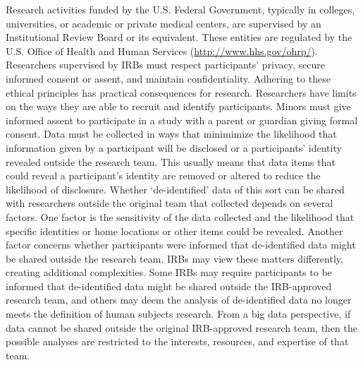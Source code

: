 \documentclass[letterpaper,man,apacite]{apa6}
\begin{document}
Research activities funded by the U.S. Federal Government, typically in colleges, universities, or academic or private medical centers, are supervised by an Institutional Review Board or its equivalent.
These entities are regulated by the U.S. Office of Health and Human Services (\url{http://www.hhs.gov/ohrp/}).
Researchers supervised by IRBs must respect participants' privacy, secure informed consent or assent, and maintain confidentiality. 
Adhering to these ethical principles has practical consequences for research.
Researchers have limits on the ways they are able to recruit and identify participants.
Minors must give informed assent to participate in a study with a parent or guardian giving formal consent.
Data must be collected in ways that minimimize the likelihood that information given by a participant will be disclosed or a participants' identity revealed outside the research team.
This usually means that data items that could reveal a participant's identity are removed or altered to reduce the likelihood of disclosure.
Whether `de-identified' data of this sort can be shared with researchers outside the original team that collected depends on several factors.
One factor is the sensitivity of the data collected and the likelihood that specific identities or home locations or other items could be revealed.
Another factor concerns whether participants were informed that de-identified data might be shared outside the research team.
IRBs may view these matters differently, creating additional complexities.
Some IRBs may require participants to be informed that de-identified data might be shared outside the IRB-approved research team, and others may deem the analysis of de-identified data no longer meets the definition of human subjects research.
From a big data perspective, if data cannot be shared outside the original IRB-approved research team, then the possible analyses are restricted to the interests, resources, and expertise of that team.
\end{document}
